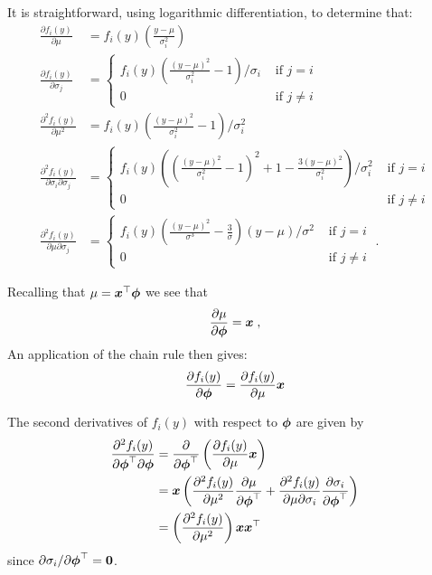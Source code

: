 It is straightforward, using logarithmic differentiation, to
determine that:
\begin{equation}
\begin{split}
\frac{\partial f_i(y)}{\partial \mu} &= f_i(y)\left( \frac{y-\mu}{\sigma_i^2} \right ) \\
\frac{\partial f_i(y)}{\partial \sigma_j} &= \left \{
\begin{array}{ll}
f_i(y)\left( \frac{(y-\mu)^2}{\sigma_i^2} - 1 \right)/\sigma_i & \mbox{~if~} j = i\\
0 & \mbox{~if~} j \neq i \end{array} \right . \\
\frac{\partial^2 f_i(y)}{\partial \mu^2} &= f_i(y) \left( 
    \frac{(y-\mu)^2}{\sigma_i^2}  - 1 \right )/\sigma_i^2 \\
\frac{\partial^2 f_i(y)}{\partial \sigma_i \partial \sigma_j} &= \left \{
\begin{array}{ll}
f_i(y) \left( \left ( \frac{(y-\mu)^2}{\sigma_i^2} - 1 \right )^2 +
            1 - \frac{3(y-\mu)^2}{\sigma_i^2} \right )/\sigma_i^2  & \mbox{~if~} j = i\\
0 & \mbox{~if~} j \neq i \end{array} \right . \\
\frac{\partial^2 f_i(y)}{\partial \mu \partial \sigma_j} &= \left \{
\begin{array}{ll}
f_i(y) \left (\frac{(y-\mu)^2}{\sigma^3} -
              \frac{3}{\sigma} \right )(y-\mu)/\sigma^2 & \mbox{~if~} j = i\\
0 & \mbox{~if~} j \neq i \end{array} \right . \; .
\end{split}
\label{eq:muSigPartials}
\end{equation}

Recalling that $\mu = \mbox{$\boldsymbol{x}$}^{\top} \mbox{$\boldsymbol{\phi}$}$ we see that
\[
\frac{\partial \mu}{\partial \mbox{$\boldsymbol{\phi}$}} = \mbox{$\boldsymbol{x}$} \; ,
\]
An application of the chain rule then gives:
\[
\frac{\partial f_i(y)}{\partial \mbox{$\boldsymbol{\phi}$}} =
                  \frac{\partial f_i(y)}{\partial \mu} \mbox{$\boldsymbol{x}$}
\]

The second derivatives of $f_i(y)$ with respect to $\mbox{$\boldsymbol{\phi}$}$
are given by
\begin{align*}
\frac{\partial^2 f_i(y)}{\partial \mbox{$\boldsymbol{\phi}$}^{\top} \partial \mbox{$\boldsymbol{\phi}$}} &=
\frac{\partial}{\partial \mbox{$\boldsymbol{\phi}$}^{\top}} \left (
                \frac{\partial f_i(y)}{\partial \mu} \mbox{$\boldsymbol{x}$}
                                 \right ) \\
&= \mbox{$\boldsymbol{x}$} \left(\frac{\partial^2 f_i(y)}{\partial \mu^2}
             \frac{\partial \mu}{\partial \mbox{$\boldsymbol{\phi}$}^{\top}} +
             \frac{\partial^2 f_i(y)}{\partial \mu \partial \sigma_i}
             \frac{\partial \sigma_i}{\partial \mbox{$\boldsymbol{\phi}$}^{\top}} \right ) \\
&= \left(\frac{\partial^2 f_i(y)}{\partial \mu^2} \right) \mbox{$\boldsymbol{x}$} \mbox{$\boldsymbol{x}$}^{\top}
\end{align*}
since $\partial \sigma_i/\partial \mbox{$\boldsymbol{\phi}$}^{\top} = \mbox{$\boldsymbol{0}$}$.

